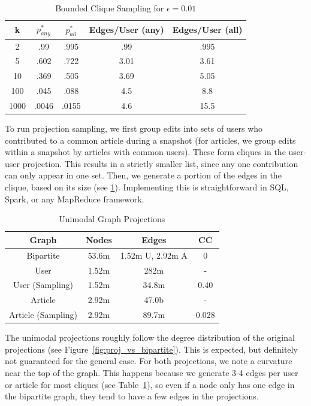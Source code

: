 \documentclass[letterpaper, 12pt, conference]{ieeeconf}
\begin{document}
\begin{table}[ht]
    \centering
    \begin{tabular}{c|c|c|c|c}
        \toprule
        k & $p_{any}^*$ & $p_{all}^* $ & Edges/User (any) & Edges/User (all) \\
        \midrule
        2 & .99 & .995 & .99 & .995 \\
        5 & .602 & .722 & 3.01 & 3.61 \\
        10 & .369 & .505 & 3.69 & 5.05 \\
        100 & .045 & .088 & 4.5 & 8.8 \\
        1000 & .0046 & .0155 & 4.6 & 15.5 \\
        \bottomrule
    \end{tabular}
    \caption{Bounded Clique Sampling for $\epsilon=0.01$}
    \label{tab:proj_sampling}
\end{table}

To run projection sampling, we first group edits into sets of users who contributed to a common article during a snapshot (for articles, we group edits within a snapshot by articles with common users). These form cliques in the user-user projection. This results in a strictly smaller list, since any one contribution can only appear in one set. Then, we generate a portion of the edges in the clique, based on its size (see \ref{tab:proj_sampling}). Implementing this is straightforward in SQL, Spark, or any MapReduce framework. 

\begin{table}[ht]
    \centering
    \begin{tabular}{c|c|c|c}
        \toprule
        Graph & Nodes & Edges & CC \\
        \midrule
        Bipartite & 53.6m & 1.52m U, 2.92m A & 0 \\
        User & 1.52m & 282m & - \\
        User (Sampling) & 1.52m & 34.8m & 0.40 \\ 
        Article & 2.92m & 47.0b & - \\
        Article (Sampling) & 2.92m & 89.7m & 0.028 \\
        \bottomrule
    \end{tabular}
    \caption{Unimodal Graph Projections}
    \label{tab:graph_projections}
\end{table}

The unimodal projections roughly follow the degree distribution of the original projections (see Figure~\ref{fig:proj_vs_bipartite}). This is expected, but definitely not guaranteed for the general case. For both projections, we note a curvature near the top of the graph. This happens because we generate 3-4 edges per user or article for most cliques (see Table~\ref{tab:proj_sampling}), so even if a node only has one edge in the bipartite graph, they tend to have a few edges in the projections.
\end{document}
